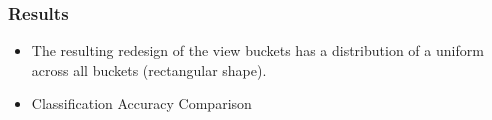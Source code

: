 \documentclass[english]{article}
\begin{document}
\subsubsection{Results}
\begin{itemize}
\item The resulting redesign of the view buckets has a distribution of a uniform across all buckets (rectangular shape).
\item{Classification Accuracy Comparison}

\end{itemize}
\end{document}
